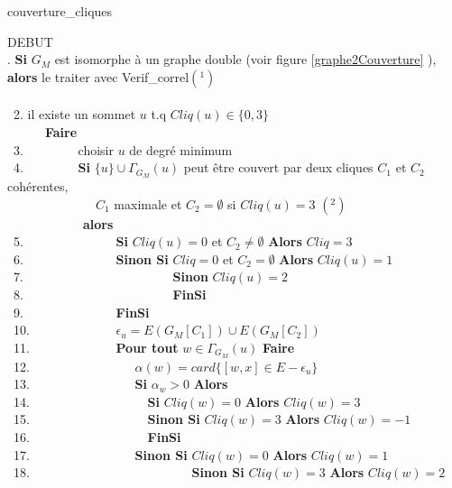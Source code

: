 \begin{algorithm}[!ht]
\caption{couverture\_cliques}
\noindent DEBUT\\
. {\bf Si} $G_M$ est isomorphe \`a un graphe double (voir figure \ref{graphe2Couverture} ), {\bf alors} le traiter avec Verif\_correl$(^1)$ \\
~~ \\
~2.  il existe un sommet $u$ t.q $Cliq(u) \in \{0,3\}$\\ 
       	\indent~~~~~~{\bf Faire}\\
~3.	       	\indent~~~~~~~~choisir $u$ de degr\'e minimum\\
~4.       	\indent~~~~~~~~{\bf Si} $\{u\} \cup \Gamma_{G_M}(u)$ peut \^etre couvert par deux cliques $C_1$ et $C_2$ coh\'erentes,\\
		\indent~~~~~~~~~~~~~~$C_1$ maximale et $C_2 = \emptyset$ si $Cliq(u)=3$ $(^2)$\\
	       	\indent~~~~~~~~~~~~{\bf alors}\\
~5.	       	\indent~~~~~~~~~~~~~~{\bf Si } $Cliq(u) = 0$ et $C_2\neq \emptyset$ {\bf Alors} $Cliq = 3$ \\
~6.		\indent~~~~~~~~~~~~~~{\bf Sinon Si} $Cliq = 0$ et $C_2 =  \emptyset$ {\bf Alors} $Cliq(u) = 1$\\
~7.		\indent~~~~~~~~~~~~~~~~~~~~~~~{\bf Sinon} $Cliq(u) = 2$ 	\\
~8.		\indent~~~~~~~~~~~~~~~~~~~~~~~{\bf FinSi}\\      	
~9.		\indent~~~~~~~~~~~~~~{\bf FinSi}\\
~10.		\indent ~~~~~~~~~~~~~$\epsilon_u = E(G_M[C_1]) \cup E(G_M[C_2])$\\
~11.		\indent ~~~~~~~~~~~~~{\bf Pour tout} $w \in \Gamma_{G_M}(u)$ {\bf Faire} \\
~12.		\indent~~~~~~~~~~~~~~~~$\alpha(w) = card\{[w,x] \in E - \epsilon_u\}$\\
~13.		\indent~~~~~~~~~~~~~~~~{\bf Si} $\alpha_w > 0$ {\bf Alors}\\
~14.		\indent~~~~~~~~~~~~~~~~~~{\bf Si} $Cliq(w) = 0$ {\bf Alors} $Cliq(w) =3$\\
~15.		\indent~~~~~~~~~~~~~~~~~~{\bf Sinon Si} $Cliq(w) = 3$ {\bf Alors} $Cliq(w) =-1$\\
~16.		\indent~~~~~~~~~~~~~~~~~~{\bf FinSi} \\
~17.		\indent~~~~~~~~~~~~~~~~{\bf Sinon Si} $Cliq(w) = 0$ {\bf Alors} $Cliq(w) =1$\\
~18. 	\indent~~~~~~~~~~~~~~~~~~~~~~~~~{\bf Sinon Si} $Cliq(w) = 3$ {\bf Alors} $Cliq(w) = 2$ \\

\end{algorithm}

